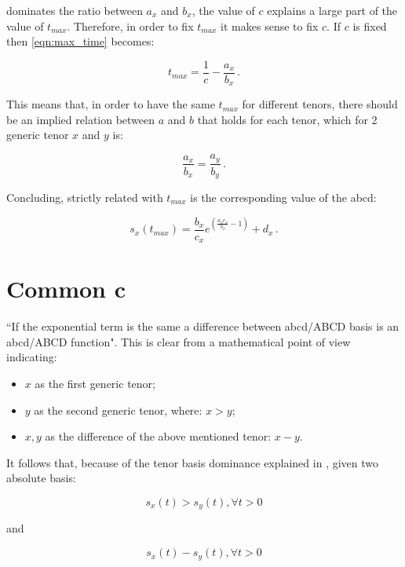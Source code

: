 {dominates the ratio between $a_{x}$ and $b_{x}$, the value of $c$ explains a large part of the value of $t_{max}$. Therefore, in order to fix $t_{max}$ it makes sense to fix $c$.
If $c$ is fixed then \eqref{eqn:max_time} becomes:

\begin{equation}
t_{max}=\dfrac{1}{c} - \dfrac{a_{x}} {b_{x}}\,.
\label{eqn:max_time_fixed_c}
\end{equation}

This means that, in order to have the same $t_{max}$ for different tenors, there should be an implied relation between $a$ and $b$ that holds for each tenor, which for 2 generic tenor $x$ and $y$ is:

\begin{equation}
    \dfrac{a_{x}} {b_{x}}=\dfrac{a_{y}} {b_{y}}\,.
\end{equation}


Concluding, strictly related with $t_{max}$ is the corresponding value of the abcd:

\begin{equation}
s_{x}(t_{max})=\frac{b_{x}}{c_{x}} e^{(\frac{a_{x}c_{x}}{b_{x}}-1)} +d_{x} \,.
\label{eqn:max_func}
\end{equation}


\section*{Common c}

``If the exponential term is the same a difference between abcd/ABCD basis is an abcd/ABCD function". 
This is clear from a mathematical point of view indicating:
\begin{itemize}
\item $x$ as the first generic tenor;
\item $y$ as the second generic tenor, where: $x > y$;
\item $x, y$ as the difference of the above mentioned tenor: $x - y$.
\end{itemize}

It follows that, because of the tenor basis dominance explained in \cite{ametrano_ballabio_mazzocchi}, given two absolute basis:

\begin{equation*}
s_{x}(t)>s_{y}(t), \forall t > 0 
\end{equation*}

and

\begin{equation*}
s_{x}(t)-s_{y}(t), \forall t > 0
\end{equation*}

}
